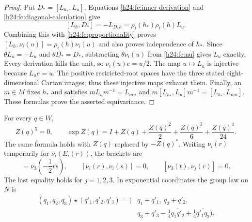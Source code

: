 \begin{proof}
Put $D_*=[L_{h_*},L_u]$. Equations
\eqref{h24:fc:inner-derivation} and
\eqref{h24:fc:diagonal-calculation} give
\[
 [L_h,D_*]=-L_{D_*h}=\rho_i(h_*)\rho_i(h)L_u.
\]
Combining this with \eqref{h24:fc:proportionality} proves
$[L_h,\nu_i(u)]=\rho_i(h)\nu_i(u)$ and also proves independence of
$h_*$. Since $\theta L_u=-L_u$ and $\theta D_*=D_*$, subtracting
$\theta\nu_i(u)$ from \eqref{h24:fc:nu} gives $L_u$ exactly.
Every derivation kills the unit, so $\nu_i(u)e=u/2$.
The map $u\mapsto L_u$ is injective because $L_ue=u$.
The positive restricted-root spaces have the three stated
eight-dimensional Cartan images; thus these injective maps exhaust
them. Finally, an $m\in M$ fixes $h_*$ and satisfies
$mL_um^{-1}=L_{mu}$ and
$m[L_{h_*},L_u]m^{-1}=[L_{h_*},L_{mu}]$.
These formulas prove the asserted equivariance.
\end{proof}

\begin{lemma}
\label{h24:fc:finite-exponential}
For every $q\in W$,
\begin{equation}
 Z(q)^5=0,\qquad
 \exp Z(q)=I+Z(q)+\frac{Z(q)^2}{2}
                   +\frac{Z(q)^3}{6}+\frac{Z(q)^4}{24}.
 \label{h24:fc:finite-exp}
\end{equation}
The same formula holds with $Z(q)$ replaced by $-Z(q)^*$.
Writing $\nu_i(r)$ temporarily for $\nu_i(E_i(r))$, the brackets are
\begin{equation}
 [\nu_1(r),\nu_2(s)]=\nu_3\left(-\frac12\overline{rs}\right),
 \qquad [\nu_i(r),\nu_i(s)]=0,
 \qquad[\nu_3(t),\nu_j(r)]=0.
 \label{h24:fc:nil-bracket}
\end{equation}
The last equality holds for $j=1,2,3$. In exponential coordinates the
group law on $N$ is
\begin{equation}
 \begin{split}
 (q_1,q_2,q_3)\star(q'_1,q'_2,q'_3)
 =\biggl(&q_1+q'_1,\ q_2+q'_2,\\
         &q_3+q'_3-\frac14\overline{q_1q'_2}
                         +\frac14\overline{q'_1q_2}\biggr).
 \end{split}
 \label{h24:fc:nil-group-law}
\end{equation}
\end{lemma}

